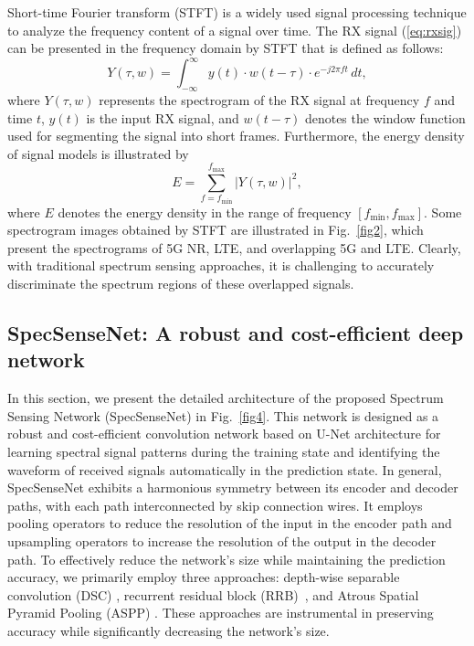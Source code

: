 \documentclass[journal]{IEEEtran} %
\begin{document}



Short-time Fourier transform (STFT) is a widely used signal processing technique to analyze the frequency content of a signal over time. The RX signal (\ref{eq:rxsig}) can be presented in the frequency domain by STFT that is defined as follows:
\begin{equation}
    {Y(\tau, w) = \int_{-\infty}^{\infty} y(t) \cdot w(t - \tau) \cdot e^{-j2\pi ft} \, dt},
    \label{eq:spectrogram}
\end{equation}
where ${Y(\tau, w)}$ represents the spectrogram of the RX signal at frequency ${f}$ and time ${t}$, ${y(t)}$ is the input RX signal, and ${w(t - \tau)}$ denotes the window function used for segmenting the signal into short frames. 
Furthermore, the energy density of signal models is illustrated by 
\begin{equation}
    {E = \sum_{f = f_{\min} }^{f_{\max}} \left| Y(\tau, w) \right|^2},
    \label{eq:energy}
\end{equation}
where $E$ denotes the energy density in the range of frequency ${\left [ f_{\min}, f_{\max} \right ]}$.
Some spectrogram images obtained by STFT are illustrated in Fig.~\ref{fig2}, which present the spectrograms of 5G NR, LTE, and overlapping 5G and LTE. 
Clearly, with traditional spectrum sensing approaches, it is challenging to accurately discriminate the spectrum regions of these overlapped signals.



\subsection{SpecSenseNet: A robust and cost-efficient deep network}
In this section, we present the detailed architecture of the proposed Spectrum Sensing Network (SpecSenseNet) in Fig.~\ref{fig4}. This network is designed as a robust and cost-efficient convolution network based on U-Net architecture \cite{ronneberger2015u} for learning spectral signal patterns during the training state and identifying the waveform of received signals automatically in the prediction state. In general, SpecSenseNet exhibits a harmonious symmetry between its encoder and decoder paths, with each path interconnected by skip connection wires. It employs pooling operators to reduce the resolution of the input in the encoder path and upsampling operators to increase the resolution of the output in the decoder path. To effectively reduce the network's size while maintaining the prediction accuracy, we primarily employ three approaches: depth-wise separable convolution (DSC) \cite{CholletXception}, recurrent residual block (RRB)~\cite{aghalari2021brain, he2016deep}, and Atrous Spatial Pyramid Pooling (ASPP) \cite{ChenAtrous}. These approaches are instrumental in preserving accuracy while significantly decreasing the network's size. 
\end{document}
